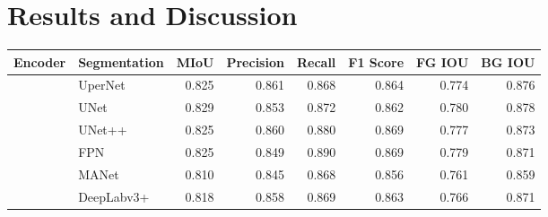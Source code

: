 \section{Results and Discussion}
\label{sec:results}

\begin{table}
	\small
	\centering
	\begin{tabular}{llrrrrrr}
		\toprule{}
		\textbf{Encoder}         & \textbf{Segmentation}                                     & \multicolumn{1}{l}{\textbf{MIoU}} & \multicolumn{1}{l}{\textbf{Precision}} & \multicolumn{1}{l}{\textbf{Recall}} & \multicolumn{1}{l}{\textbf{F1 Score}} & \multicolumn{1}{l}{\textbf{FG IOU}} & \multicolumn{1}{l}{\textbf{BG IOU}} \\
		\midrule{}
		\multirow{8}{*}{I-JEPA}  & UperNet~\cite{DBLP:journals/corr/abs-1807-10221}          & 0.825                             & 0.861                                  & 0.868                               & 0.864                                 & 0.774                               & 0.876                               \\
		                         & UNet~\cite{ronneberger2015unet}                           & 0.829                             & 0.853                                  & 0.872                               & 0.862                                 & 0.780                               & 0.878                               \\
		                         & UNet++ ~\cite{zhou2019unetplusplus}                       & 0.825                             & 0.860                                  & 0.880                               & 0.869                                 & 0.777                               & 0.873                               \\
		                         & FPN~\cite{DBLP:journals/corr/LinDGHHB16}                  & 0.825                             & 0.849                                  & 0.890                               & 0.869                                 & 0.779                               & 0.871                               \\
		                         & MANet~\cite{Li_2022}                                      & 0.810                             & 0.845                                  & 0.868                               & 0.856                                 & 0.761                               & 0.859                               \\
		                         & DeepLabv3+~\cite{DBLP:journals/corr/abs-1802-02611}       & 0.818                             & 0.858                                  & 0.869                               & 0.863                                 & 0.766                               & 0.871                               \\

\end{tabular}
\end{table}
